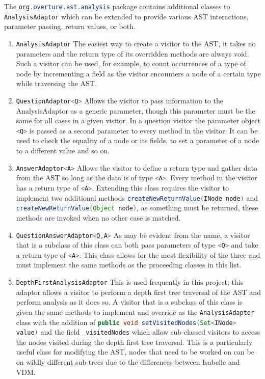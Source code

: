 	The \lstinline[language=Java]{org.overture.ast.analysis} package contains additional classes to \lstinline[language=Java]{AnalysisAdaptor} which can be extended to provide various AST interactions, parameter passing, return values, or both. 
	\begin{enumerate}
		\item \lstinline[language=Java]{AnalysisAdaptor} The easiest way to create a visitor to the AST, it takes no parameters and the return type of its overridden methods are always void. Such a visitor can be used, for example, to count occurrences of a type of node by incrementing a field as the visitor encounters a node of a certain type while traversing the AST. 
		\item \lstinline[language=Java]{QuestionAdaptor<Q>} Allows the visitor to pass information to the AnalysisAdaptor as a generic parameter, though this parameter must be the same for all cases in a given visitor. In a question visitor the parameter object \lstinline[language=Java]{<Q>} is passed as a second parameter to every method in the visitor. It can be used to check the equality of a node or its fields, to set a parameter of a node to a different value and so on.
		\item \lstinline[language=Java]{AnswerAdaptor<A>} Allows the visitor to define a return type and gather data from the AST so long as the data is of type \lstinline[language=Java]{<A>}. Every method in the visitor has a return type of \lstinline[language=Java]{<A>}. Extending this class requires the visitor to implement two additional methods \lstinline[language=Java]{createNewReturnValue(INode node)} and \lstinline[language=Java]{createNewReturnValue(Object node)}, as something must be returned, these methods are invoked when no other case is matched.
		\item \lstinline[language=Java]{QuestionAnswerAdaptor<Q,A>} As may be evident from the name, a visitor that is a subclass of this class can both pass parameters of type \lstinline[language=Java]{<Q>} and take a return type of \lstinline[language=Java]{<A>}. This class allows for the most flexibility of the three and must implement the same methods as the proceeding classes in this list.
		\item \lstinline[language=Java]{DepthFirstAnalysisAdaptor} This is used frequently in this project; this adaptor allows a visitor to perform a depth first tree traversal of the AST and perform analysis as it does so. A visitor that is a subclass of this class is given the same methods to implement and override as the \lstinline[language=Java]{AnalysisAdaptor} class with the addition of \lstinline[language=Java]{public void setVisitedNodes(Set<INode> value)} and the field \lstinline[language=Java]{_visitedNodes} which allow sub-classed visitors to access the nodes visited during the depth first tree traversal. This is a particularly useful class for modifying the AST, nodes that need to be worked on can be on wildly different sub-trees due to the differences between Isabelle and VDM.

\end{enumerate}
